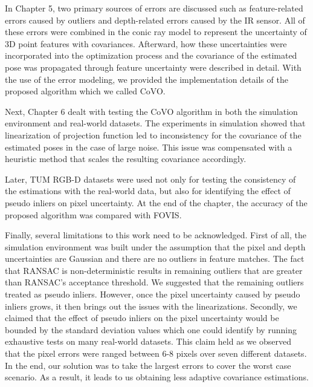 \documentclass[a4paper]{report}
\numberwithin{figure}{section}
\begin{document}
In Chapter 5, two primary sources of errors are discussed such as
feature-related errors caused by outliers and depth-related errors caused by
the IR sensor.  All of these errors were combined in the conic ray model to
represent the uncertainty of 3D point features with covariances.
Afterward, how these uncertainties were incorporated into the optimization
process and the covariance of the estimated pose was propagated through feature
uncertainty were described in detail. With the use of the error modeling, we
provided the implementation details of the proposed algorithm which we called
CoVO.

Next, Chapter 6 dealt with testing the CoVO algorithm in both the simulation
environment and real-world datasets. 
The experiments in simulation showed that linearization of projection function
led to inconsistency for the covariance of the estimated poses in the case of
large noise.  This issue was compensated with a heuristic method that scales
the resulting covariance accordingly.

Later, TUM RGB-D datasets were used not only for testing the consistency of the
estimations with the real-world data, but also for identifying the effect of
pseudo inliers on pixel uncertainty. 
At the end of the chapter, the accuracy of the proposed algorithm was compared
with FOVIS.

Finally, several limitations to this work need to be acknowledged.  First of
all, the simulation environment was built under the assumption that the pixel
and depth uncertainties are Gaussian and there are no outliers in feature
matches. The fact that RANSAC is non-deterministic results in remaining
outliers that are greater than RANSAC's acceptance threshold. We suggested that
the remaining outliers treated as pseudo inliers.  However, once the pixel
uncertainty caused by pseudo inliers grows, it then brings out the issues with
the linearizations.  Secondly, we claimed that the effect of pseudo inliers on
the pixel uncertainty would be bounded by the standard deviation values which
one could identify by running exhaustive tests on many real-world datasets.
This claim held as we observed that the pixel errors were ranged between 6-8 
pixels
over seven different datasets. In the end, our solution was to take the largest
errors to cover the worst case scenario.  As a result, it leads to us obtaining less 
adaptive covariance estimations. 
\end{document}
